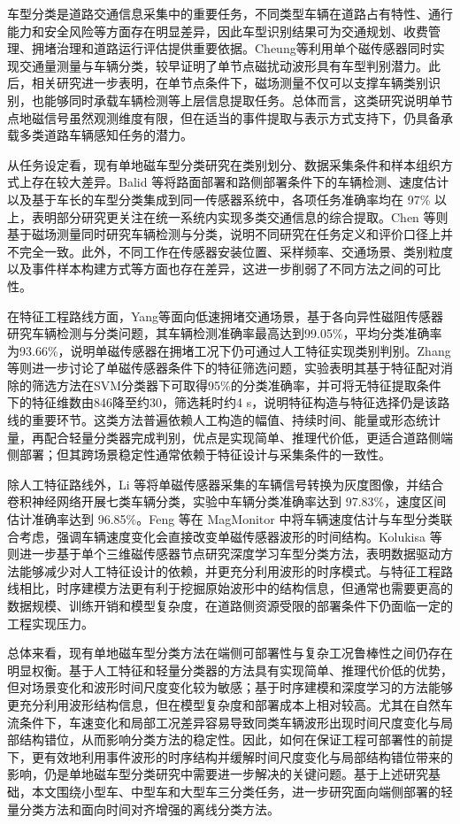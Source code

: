 \documentclass{xdupgthesis}
\begin{document}
车型分类是道路交通信息采集中的重要任务，不同类型车辆在道路占有特性、通行能力和安全风险等方面存在明显差异，因此车型识别结果可为交通规划、收费管理、拥堵治理和道路运行评估提供重要依据。Cheung等\cite{R17}利用单个磁传感器同时实现交通量测量与车辆分类，较早证明了单节点磁扰动波形具有车型判别潜力。此后，相关研究进一步表明，在单节点条件下，磁场测量不仅可以支撑车辆类别识别，也能够同时承载车辆检测等上层信息提取任务\cite{R19}。总体而言，这类研究说明单节点地磁信号虽然观测维度有限，但在适当的事件提取与表示方式支持下，仍具备承载多类道路车辆感知任务的潜力。

从任务设定看，现有单地磁车型分类研究在类别划分、数据采集条件和样本组织方式上存在较大差异。Balid 等\cite{R18}将路面部署和路侧部署条件下的车辆检测、速度估计以及基于车长的车型分类集成到同一传感器系统中，各项任务准确率均在 97\% 以上，表明部分研究更关注在统一系统内实现多类交通信息的综合提取。Chen 等\cite{R19}则基于磁场测量同时研究车辆检测与分类，说明不同研究在任务定义和评价口径上并不完全一致。此外，不同工作在传感器安装位置、采样频率、交通场景、类别粒度以及事件样本构建方式等方面也存在差异，这进一步削弱了不同方法之间的可比性。

在特征工程路线方面，Yang等\cite{R20}面向低速拥堵交通场景，基于各向异性磁阻传感器研究车辆检测与分类问题，其车辆检测准确率最高达到99.05\%，平均分类准确率为93.66\%，说明单磁传感器在拥堵工况下仍可通过人工特征实现类别判别。Zhang等\cite{ch3_zhang2019featureselection}则进一步讨论了单磁传感器条件下的特征筛选问题，实验表明其基于特征配对消除的筛选方法在SVM分类器下可取得95\%的分类准确率，并可将无特征提取条件下的特征维数由846降至约30，筛选耗时约4 s，说明特征构造与特征选择仍是该路线的重要环节。这类方法普遍依赖人工构造的幅值、持续时间、能量或形态统计量，再配合轻量分类器完成判别，优点是实现简单、推理代价低，更适合道路侧端侧部署；但其跨场景稳定性通常依赖于特征设计与采集条件的一致性。

除人工特征路线外，Li 等\cite{ch3_li2020singlemag}将单磁传感器采集的车辆信号转换为灰度图像，并结合卷积神经网络开展七类车辆分类，实验中车辆分类准确率达到 97.83\%，速度区间估计准确率达到 96.85\%。Feng 等\cite{feng2022magmonitor}在 MagMonitor 中将车辆速度估计与车型分类联合考虑，强调车辆速度变化会直接改变单磁传感器波形的时间结构。Kolukisa 等\cite{R26}则进一步基于单个三维磁传感器节点研究深度学习车型分类方法，表明数据驱动方法能够减少对人工特征设计的依赖，并更充分利用波形的时序模式。与特征工程路线相比，时序建模方法更有利于挖掘原始波形中的结构信息，但通常也需要更高的数据规模、训练开销和模型复杂度，在道路侧资源受限的部署条件下仍面临一定的工程实现压力。

总体来看，现有单地磁车型分类方法在端侧可部署性与复杂工况鲁棒性之间仍存在明显权衡。基于人工特征和轻量分类器的方法具有实现简单、推理代价低的优势，但对场景变化和波形时间尺度变化较为敏感；基于时序建模和深度学习的方法能够更充分利用波形结构信息，但在模型复杂度和部署成本上相对较高。尤其在自然车流条件下，车速变化和局部工况差异容易导致同类车辆波形出现时间尺度变化与局部结构错位，从而影响分类方法的稳定性。因此，如何在保证工程可部署性的前提下，更有效地利用事件波形的时序结构并缓解时间尺度变化与局部结构错位带来的影响，仍是单地磁车型分类研究中需要进一步解决的关键问题。基于上述研究基础，本文围绕小型车、中型车和大型车三分类任务，进一步研究面向端侧部署的轻量分类方法和面向时间对齐增强的离线分类方法。
\end{document}
